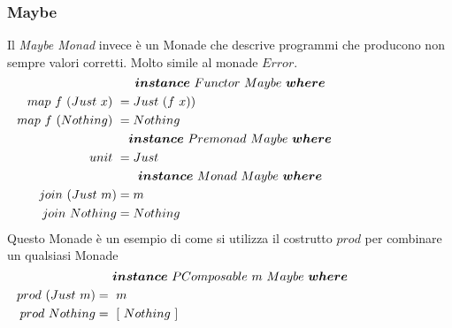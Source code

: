 \subsubsection*{Maybe}
Il \textit{Maybe Monad} invece è un Monade che descrive programmi che producono
non sempre valori corretti.
Molto simile al monade $Error$.
\begin{align*}
  \classdef{\bm{instance}\ Functor\ Maybe\ \bm{where}}
  map\ f\ (Just\ x)\ &= Just\ (f\ x))\\
  map\ f\ (Nothing)\ &= Nothing\\
  \classdef{\bm{instance}\ Premonad\ Maybe\ \bm{where}}
  unit\ &= Just\\
  \classdef{\bm{instance}\ Monad\ Maybe\ \bm{where}}
  join\ (Just\ m) &= m\\
  join\ Nothing &= Nothing\
\end{align*}
Questo Monade è un esempio di come si utilizza il costrutto $prod$ per combinare
un qualsiasi Monade
\begin{align*}
  \classdef{\bm{instance}\ PComposable\ m\ Maybe\ \bm{where}}
  prod\ (Just\ m) &=\ m\\
  prod\ Nothing &=\ [\ Nothing\ ]\\
\end{align*}

\pagebreak